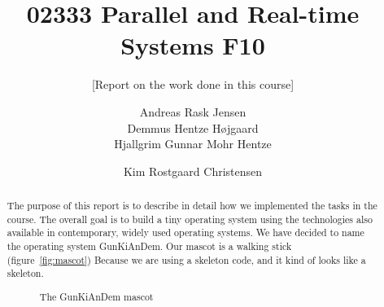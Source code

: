 \documentclass{acm_proc_article-sp}
\begin{document}
\title{02333 Parallel and Real-time Systems F10}
\subtitle{[Report on the work done in this course]
}

\author{
\alignauthor
Andreas Rask Jensen\\
\alignauthor
Demmus Hentze Højgaard\\
\alignauthor
Hjallgrim Gunnar Mohr Hentze\\
\and  %
\alignauthor 
Kim Rostgaard Christensen\\
}

\maketitle

\begin{abstract}
The purpose of this report is to describe in detail how we implemented the tasks in the course. The overall goal is to build a tiny operating system using the technologies also available in contemporary, widely used operating systems. We have decided to name the operating system GunKiAnDem. Our mascot is a walking stick (figure~\ref{fig:mascot}) Because we are using a skeleton code, and it kind of looks like a skeleton. 
\begin{figure}
\centering
{}
\caption{The GunKiAnDem mascot}
\label{fig:mascot}
\end{figure}
\end{abstract}


\end{document}
